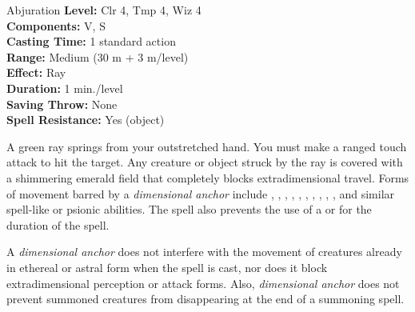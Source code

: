 {Abjuration}
{
	\textbf{Level:}
	Clr 4, Tmp 4, Wiz 4\\
	\textbf{Components:}
	V, S\\
	\textbf{Casting Time:}
	1 standard action\\
	\textbf{Range:}
	Medium (30 m + 3 m/level)\\
	\textbf{Effect:}
	Ray\\
	\textbf{Duration:}
	1 min./level\\
	\textbf{Saving Throw:}
	None\\
	\textbf{Spell Resistance:}
	Yes (object)\\
}
{
	A green ray springs from your outstretched hand. You must make a ranged touch attack to hit the target. Any creature or object struck by the ray is covered with a shimmering emerald field that completely blocks extradimensional travel. Forms of movement barred by a \emph{dimensional anchor} include , , , , , , , , , , and similar spell-like or psionic abilities. The spell also prevents the use of a  or  for the duration of the spell.

	A \emph{dimensional anchor} does not interfere with the movement of creatures already in ethereal or astral form when the spell is cast, nor does it block extradimensional perception or attack forms. Also, \emph{dimensional anchor} does not prevent summoned creatures from disappearing at the end of a summoning spell.

}
